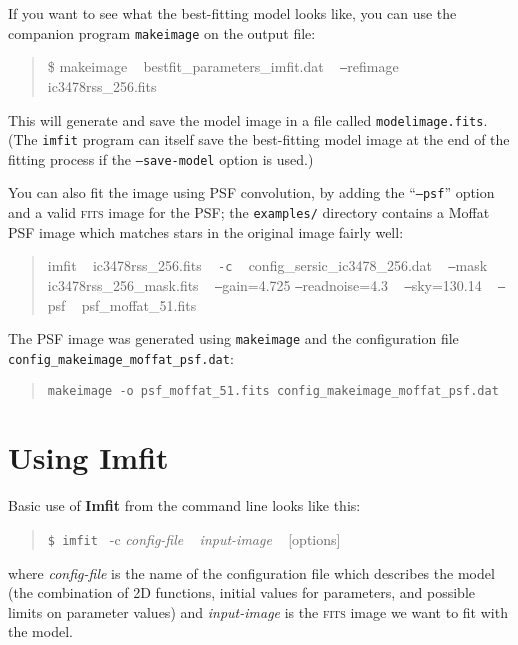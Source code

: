 \documentclass[10pt,a4paper,article]{memoir}
\newcommand{\imfit}{\textbf{Imfit}}
\newcommand{\Imfit}{\textbf{Imfit}}
\newcommand{\imfitprog}{\texttt{imfit}}
\newcommand{\makeimage}{\texttt{makeimage}}
\begin{document}
If you want to see what the best-fitting model looks like, you can use the companion program \makeimage{}
on the output file:
\begin{quote}
\$ makeimage ~ bestfit\_parameters\_imfit.dat ~ \texttt{--}refimage ~ ic3478rss\_256.fits
\end{quote}
This will generate and save the model image in a file called \texttt{modelimage.fits}. (The \imfitprog{}
program 
can itself save the best-fitting model image at the end of the fitting process if
the \texttt{--save-model} option is used.)


You can also fit the image using PSF convolution, by adding the ``\texttt{--psf}'' option and a
valid \textsc{fits} image for the PSF; the \texttt{examples/} directory contains a Moffat PSF image which
matches stars in the original image fairly well:
\begin{quote}
imfit ~ ic3478rss\_256.fits ~ \texttt{-c} ~ config\_sersic\_ic3478\_256.dat ~ \texttt{--}mask ~ ic3478rss\_256\_mask.fits ~ \texttt{--}gain=4.725 \texttt{--}readnoise=4.3 ~ \texttt{--}sky=130.14 ~ \texttt{--}psf ~ psf\_moffat\_51.fits
\end{quote}


The PSF image was generated using \makeimage{} and the configuration
file \\
\texttt{config\_makeimage\_moffat\_psf.dat}:
\begin{quote}
\texttt{makeimage -o psf\_moffat\_51.fits config\_makeimage\_moffat\_psf.dat}
\end{quote}




\newpage

\chapter{Using \Imfit{}}\label{sec:using-imfit}\label{chap:using-imfit}

Basic use of \imfit{} from the command line looks like this:
\begin{quote}
  \texttt{\$ \imfitprog{} }  -c \textit{config-file} ~ \textit{input-image} ~ [options]
\end{quote}
where \textit{config-file} is the name of the configuration file
which describes the model (the combination of 2D functions, initial values
for parameters, and possible limits on parameter values) and \textit{input-image}
is the \textsc{fits} image we want to fit with the model. 
\end{document}
